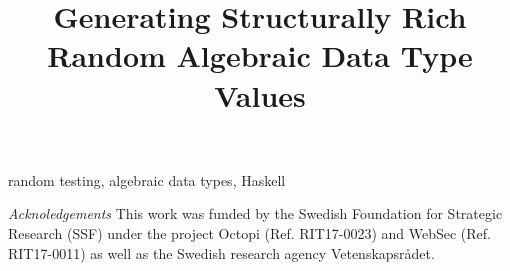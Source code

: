 \documentclass[conference, fleqn]{IEEEtran}
\begin{document}
\title{Generating Structurally Rich \\ Random Algebraic Data Type Values}

\author{
\and
{}
}

\maketitle


\newenvironment{CompactItemize}%
  {\begin{list}{$\, \  \blacktriangleright$}%
   {\leftmargin=0pt \itemsep=2pt \topsep=5pt
     \parsep=0pt \partopsep=0pt}}%
  {\end{list}}




\begin{IEEEkeywords}
random testing, algebraic data types, Haskell
\end{IEEEkeywords}










\emph{Acknoledgements} This work was funded by the Swedish Foundation for
Strategic Research (SSF) under the project Octopi (Ref. RIT17-0023) and WebSec
(Ref. RIT17-0011) as well as the Swedish research agency Vetenskapsr\r{a}det.



\end{document}
